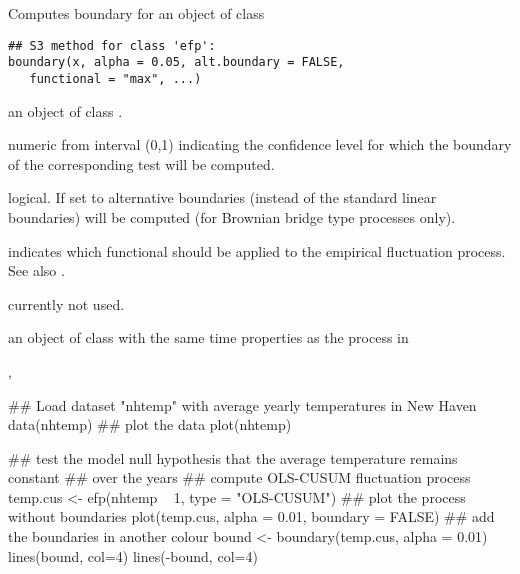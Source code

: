 \begin{Description}\relax
Computes boundary for an object of class \end{Description}
\begin{Usage}
\begin{verbatim}
## S3 method for class 'efp':
boundary(x, alpha = 0.05, alt.boundary = FALSE,
   functional = "max", ...)
\end{verbatim}
\end{Usage}
\begin{Arguments}
\begin{ldescription}
\item[\code{x}] an object of class .
\item[\code{alpha}] numeric from interval (0,1) indicating the confidence level for
which the boundary of the corresponding test will be computed.
\item[\code{alt.boundary}] logical. If set to  alternative boundaries
(instead of the standard linear boundaries) will be computed (for Brownian
bridge type processes only).
\item[\code{functional}] indicates which functional should be applied to the
empirical fluctuation process. See also .
\item[\code{...}] currently not used.
\end{ldescription}
\end{Arguments}
\begin{Value}
an object of class  with the same time properties as
the process in \end{Value}
\begin{SeeAlso}\relax
{}, \end{SeeAlso}
\begin{Examples}
\begin{ExampleCode}
## Load dataset "nhtemp" with average yearly temperatures in New Haven
data(nhtemp)
## plot the data
plot(nhtemp)

## test the model null hypothesis that the average temperature remains constant
## over the years
## compute OLS-CUSUM fluctuation process
temp.cus <- efp(nhtemp ~ 1, type = "OLS-CUSUM")
## plot the process without boundaries
plot(temp.cus, alpha = 0.01, boundary = FALSE)
## add the boundaries in another colour
bound <- boundary(temp.cus, alpha = 0.01)
lines(bound, col=4)
lines(-bound, col=4)
\end{ExampleCode}
\end{Examples}

